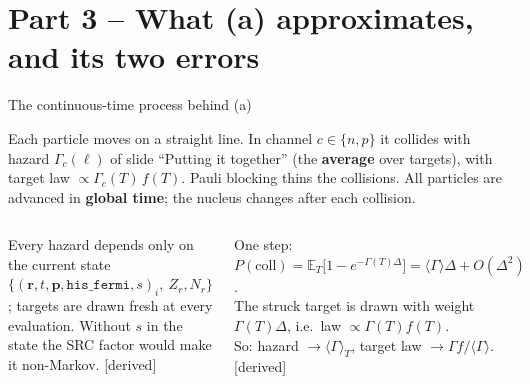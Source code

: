 \documentclass[10pt,aspectratio=169]{beamer}
\newcommand{\G}{\Gamma}
\newcommand{\tagder}{{\scriptsize\color{black!60}[derived]}}
\begin{document}
\section{Part 3 -- What (a) approximates, and its two errors}

\begin{frame}{The continuous-time process behind (a)}
\small
\begin{tcolorbox}[colback=aBlue!5,colframe=aBlue,boxrule=0.8pt,title=Target process,fonttitle=\bfseries\small]
Each particle moves on a straight line. In channel $c\in\{n,p\}$ it collides with hazard $\G_c(\ell)$ of slide ``Putting it together'' (the \textbf{average} over targets), with target law $\propto\G_c(T)\,f(T)$. Pauli blocking thins the collisions. All particles are advanced in \textbf{global time}; the nucleus changes after each collision.
\end{tcolorbox}
\begin{columns}[T]
\begin{derivbox}[It is Markov]
Every hazard depends only on the current state $\{(\mathbf r,t,\mathbf p,\texttt{his\_fermi},s)_i,\ Z_r,N_r\}$; targets are drawn fresh at every evaluation. Without $s$ in the state the SRC factor would make it non-Markov. \tagder
\end{derivbox}
\begin{derivbox}
One step: $P(\text{coll})=\mathbb E_T\big[1-e^{-\G(T)\Delta}\big]=\langle\G\rangle\Delta+O(\Delta^2)$.\\
The struck target is drawn with weight $\G(T)\Delta$, i.e.\ law $\propto\G(T)f(T)$.\\
So: hazard $\to\langle\G\rangle_T$, target law $\to\G f/\langle\G\rangle$. \tagder
\end{derivbox}
\end{columns}
\end{frame}
\end{document}
